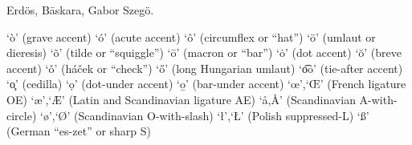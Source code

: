 Erd\"os, B\=askara, Gabor Szeg\"o.

`\`o' (grave accent)
`\'o' (acute accent)
`\^o' (circumflex or “hat”)
`\"o' (umlaut or dieresis)
`\~o' (tilde or “squiggle”)
`\=o' (macron or “bar”)
`\.o' (dot accent)
`\u o' (breve accent)
`\v o' (há\v cek or “check”)
`\H o' (long Hungarian umlaut)
`\t oo' (tie-after accent)
`\c o' (cedilla)
`\d o' (dot-under accent)
`\b o' (bar-under accent)
`\oe',`\OE' (French ligature OE)
`\ae',`\AE' (Latin and 
             Scandinavian ligature AE)
`\aa,\AA' (Scandinavian A-with-circle)
`\o',`\O' (Scandinavian O-with-slash)
`\l',`\L' (Polish suppressed-L)
`\ss' (German “es-zet” or sharp S)
